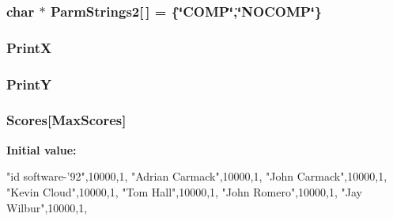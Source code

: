 \hypertarget{ID__US__1_8C_ad4497d0cefc587c9101b54729d150f1c}{
\subsubsection[{ParmStrings2}]{\setlength{\rightskip}{0pt plus 5cm}char $\ast$ {\bf ParmStrings2}\mbox{[}$\,$\mbox{]} = \{\char`\"{}COMP\char`\"{},\char`\"{}NOCOMP\char`\"{}\}}}
\label{ID__US__1_8C_ad4497d0cefc587c9101b54729d150f1c}
\hypertarget{ID__US__1_8C_af88ed0e04fa671a4e672334f1e0c4828}{
\subsubsection[{PrintX}]{ {\bf PrintX}}}
\label{ID__US__1_8C_af88ed0e04fa671a4e672334f1e0c4828}
\hypertarget{ID__US__1_8C_a9ba4b756f739163c3d3d5736cba818a4}{
\subsubsection[{PrintY}]{ {\bf PrintY}}}
\label{ID__US__1_8C_a9ba4b756f739163c3d3d5736cba818a4}
\hypertarget{ID__US__1_8C_a21091ead46c77ab22e506731e48c8d5e}{
\subsubsection[{Scores}]{ {\bf Scores}\mbox{[}MaxScores\mbox{]}}}
\label{ID__US__1_8C_a21091ead46c77ab22e506731e48c8d5e}
{\bfseries Initial value:}
\begin{DoxyCode}

                                        {
                                                {"id software-'92",10000,1},
                                                {"Adrian Carmack",10000,1},
                                                {"John Carmack",10000,1},
                                                {"Kevin Cloud",10000,1},
                                                {"Tom Hall",10000,1},
                                                {"John Romero",10000,1},
                                                {"Jay Wilbur",10000,1},
                                        }
\end{DoxyCode}
